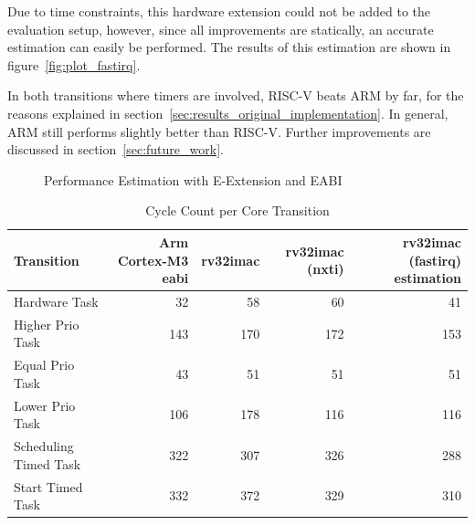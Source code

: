 Due to time constraints, this hardware extension could not be added to the evaluation setup, however, since all improvements are statically, an accurate estimation can easily be performed. The results of this estimation are shown in figure~\ref{fig:plot_fastirq}.

In both transitions where timers are involved, RISC-V beats ARM by far, for the reasons explained in section~\ref{sec:results_original_implementation}. In general, ARM still performs slightly better than RISC-V. Further improvements are discussed in section~\ref{sec:future_work}.


\begin{figure}
\caption{Performance Estimation with E-Extension and EABI}
\end{figure}


\begin{table}
  \centerfloat
  \begin{tabular}{ l r r r r }
    \toprule
    Transition & Arm Cortex-M3 eabi & rv32imac & rv32imac (nxti) & rv32imac (fastirq) estimation \\
    \midrule
    Hardware Task & 32 & 58 & 60 & 41\\
    Higher Prio Task & 143 & 170 & 172 & 153 \\
    Equal Prio Task & 43 & 51 & 51 & 51\\
    Lower Prio Task & 106 & 178 & 116 & 116\\
    Scheduling Timed Task & 322 & 307 & 326 & 288\\
    Start Timed Task & 332 & 372 & 329 & 310 \\
    \bottomrule
  \end{tabular}
  \caption{Cycle Count per Core Transition}%
  \label{tbl:detailed_results}
\end{table}

